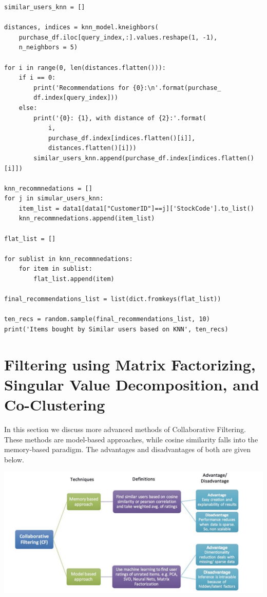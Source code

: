 \documentclass{article}
\begin{document}
\begin{lstlisting}
similar_users_knn = []

distances, indices = knn_model.kneighbors(
    purchase_df.iloc[query_index,:].values.reshape(1, -1),
    n_neighbors = 5)

for i in range(0, len(distances.flatten())):
    if i == 0:
        print('Recommendations for {0}:\n'.format(purchase_
        df.index[query_index]))
    else:
        print('{0}: {1}, with distance of {2}:'.format(
            i,
            purchase_df.index[indices.flatten()[i]],
            distances.flatten()[i]))
        similar_users_knn.append(purchase_df.index[indices.flatten()[i]])

knn_recommnedations = []
for j in simular_users_knn:
    item_list = data1[data1["CustomerID"]==j]['StockCode'].to_list()
    knn_recommnedations.append(item_list)

flat_list = []

for sublist in knn_recommnedations:
    for item in sublist:
        flat_list.append(item)

final_recommendations_list = list(dict.fromkeys(flat_list))

ten_recs = random.sample(final_recommendations_list, 10)
print('Items bought by Similar users based on KNN', ten_recs)
\end{lstlisting}

\section{Filtering using Matrix Factorizing, Singular Value Decomposition, and Co-Clustering}

In this section we discuss more advanced methods of Collaborative Filtering. These methods are model-based approaches, while cosine similarity falls into the memory-based paradigm. The advantages and disadvantages of both are given below.

\begin{center}
\includegraphics[scale=0.25]{03.png}
\end{center}
\end{document}
